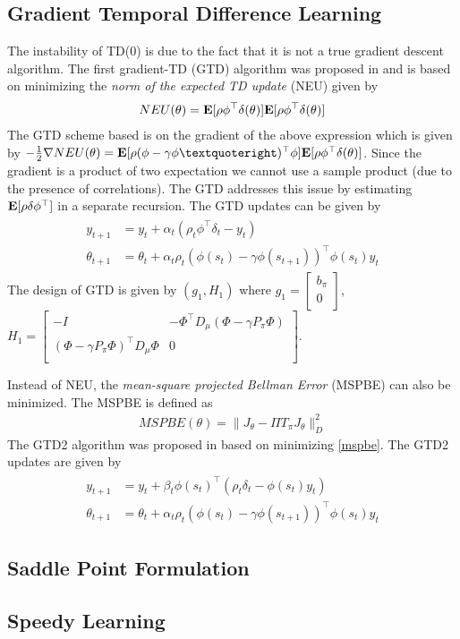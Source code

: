 \subsection{Gradient Temporal Difference Learning}
The instability of TD($0$) is due to the fact that it is not a true gradient descent algorithm. The first gradient-TD (GTD) algorithm was proposed in \cite{} and is based on minimizing the \emph{norm of the expected TD update} (NEU) given by
\begin{align}\label{neu}
NEU(\theta)=\mathbf{E}[\rho\phi^\top\delta(\theta)]\mathbf{E}[\rho\phi^\top\delta(\theta)]
\end{align}
The GTD scheme based is on the gradient of the above expression which is given by $-\frac{1}{2}\nabla NEU(\theta)=\E[\rho (\phi-\gamma\phi’)^\top \phi]\E[\rho \phi^\top\delta(\theta)]$. Since the gradient is a product of two expectation we cannot use a sample product (due to the presence of correlations). The GTD addresses this issue by estimating $\mathbf{E}[\rho\delta\phi^\top]$ in a separate recursion. The GTD updates can be given by
\begin{align}
\begin{split}
y_{t+1}&=y_t+\alpha_t(\rho_t\phi^\top\delta_t -y_t)\\
\theta_{t+1}&=\theta_t+\alpha_t\rho_t(\phi(s_t)-\gamma\phi(s_{t+1}))^\top\phi(s_t)y_t
\end{split}
\end{align}
The design of GTD is given by $(g_1,H_1)$ where $g_1=\begin{bmatrix}b_\pi\\ 0\\ \end{bmatrix}$, $H_1=\begin{bmatrix}-I &-\Phi^\top D_\mu (\Phi -\gamma P_\pi\Phi) \\ (\Phi -\gamma P_\pi\Phi)^\top D_\mu\Phi &0 \\ \end{bmatrix}$.\par
Instead of NEU, the \emph{mean-square projected Bellman Error} (MSPBE) can also be minimized. The MSPBE is defined as
\begin{align}\label{mspbe}
MSPBE(\theta)=\parallel J_\theta-\Pi T_\pi J_\theta \parallel^2_D
\end{align}
The GTD2 algorithm was proposed in \cite{} based on minimizing \eqref{mspbe}. The GTD2 updates are given by
\begin{align}
\begin{split}
y_{t+1}&=y_t+\beta_t\phi(s_t)^\top(\rho_t\delta_t-\phi(s_t)y_t)\\
\theta_{t+1}&=\theta_t+\alpha_t\rho_t(\phi(s_t)-\gamma\phi(s_{t+1}))^\top\phi(s_t)y_t
\end{split}
\end{align}
\subsection{Saddle Point Formulation}
\subsection{Speedy Learning}